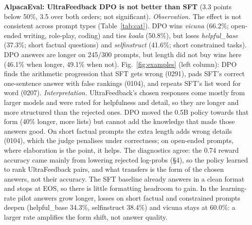 \documentclass[10pt]{article}
\begin{document}
\textbf{AlpacaEval: UltraFeedback DPO is not better than SFT} (3.3 points below 50\%, 3.5 over both orders; not
significant).
\emph{Observation.} The effect is not consistent across prompt types (Table~\ref{tab:cat}). DPO wins
\emph{vicuna} (66.2\%; open-ended writing, role-play, coding) and ties \emph{koala} (50.8\%), but loses
\emph{helpful\_base} (37.3\%; short factual questions) and \emph{selfinstruct} (41.6\%; short constrained tasks).
DPO answers are longer on 245/300 prompts, but length did not buy wins here (46.1\% when longer, 49.1\% when not).
Fig.~\ref{fig:examples} (left column): DPO finds the arithmetic progression that SFT gets wrong (0291), pads
SFT's correct one-sentence answer with false rankings (0104), and repeats SFT's list word for word (0207).
\emph{Interpretation.} UltraFeedback's chosen responses come mostly from larger models and were rated for
helpfulness and detail, so they are longer and more structured than the rejected ones. DPO moved the 0.5B policy
towards that form (40\% longer, more lists) but cannot add the knowledge that made those answers good. On short
factual prompts the extra length adds wrong details (0104), which the judge penalises under correctness; on
open-ended prompts, where elaboration is the point, it helps. The diagnostics agree: the 0.74 reward accuracy came mainly from lowering rejected log-probs (\S4),
so the policy learned to rank UltraFeedback pairs, and what transfers is the form of the chosen answers, not their
accuracy. The SFT baseline already
answers in a clean format and stops at EOS, so there is little formatting headroom to gain. In the learning-rate pilot
answers grow longer, losses on short factual and constrained prompts deepen (helpful\_base 34.3\%, selfinstruct
38.4\%) and vicuna stays at 60.0\%: a larger rate amplifies the form shift, not answer quality.
\end{document}
